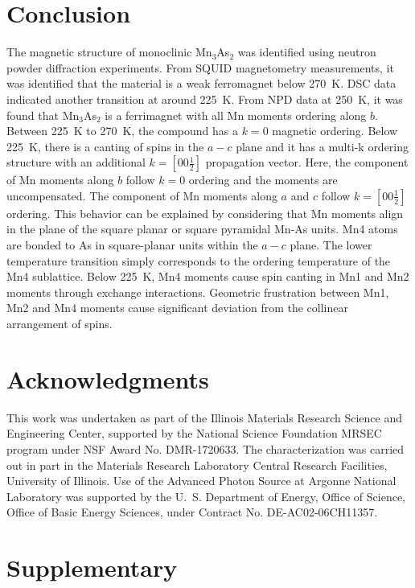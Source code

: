 \documentclass[10pt,doublespacing,edeposit]{uiucthesis2020}
\begin{document}
\begin{mainmatter}
\section{Conclusion}

The magnetic structure of monoclinic Mn$_3$As$_2$ was identified using neutron powder diffraction experiments. From SQUID magnetometry measurements, it was identified that the material is a weak ferromagnet below 270~K. DSC data indicated another transition at around 225~K. From NPD data at 250~K, it was found that Mn$_3$As$_2$ is a ferrimagnet with all Mn moments ordering along $b$. Between 225~K to 270~K, the compound has a $k = 0$ magnetic ordering. Below 225~K, there is a canting of spins in the $a-c$ plane and it has a multi-k ordering structure with an additional $k = [00\frac{1}{2}]$ propagation vector. Here, the component of Mn moments along $b$ follow $k = 0$ ordering and the moments are uncompensated. The component of Mn moments along $a$ and $c$ follow $k = [00\frac{1}{2}]$ ordering. This behavior can be explained by considering that Mn moments align in the plane of the square planar or square pyramidal Mn-As units. Mn4 atoms are bonded to As in square-planar units within the $a-c$ plane. The lower temperature transition simply corresponds to the ordering temperature of the Mn4 sublattice.  Below 225~K, Mn4 moments cause spin canting in Mn1 and Mn2 moments through exchange interactions. Geometric frustration between Mn1, Mn2 and Mn4 moments cause significant deviation from the collinear arrangement of spins.

\section{Acknowledgments}
This work was undertaken as part of the Illinois Materials Research Science and Engineering Center, supported by the National Science Foundation MRSEC program under NSF Award No. DMR-1720633. 
The characterization was carried out in part in the Materials Research Laboratory Central Research Facilities, University of Illinois.
Use of the Advanced Photon Source at Argonne National Laboratory was supported by the U.~S. Department of Energy, Office of Science, Office of Basic Energy Sciences, under Contract No. DE-AC02-06CH11357.

\section{Supplementary}



\end{mainmatter}
\end{document}
